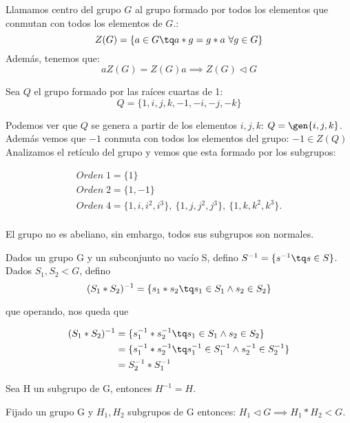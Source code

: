 \documentclass[nochap]{apuntes}
\begin{document}
\begin{defn}
	Llamamos centro del grupo $G$ al grupo formado por todos los elementos que conmutan con todos los elementos de $G$.:\\
	\[ Z(G) = \{ a\in G\tq a\ast g = g\ast a\ \forall g\in G\} \]
	Además, tenemos que:
	\[ aZ(G)=Z(G)a \implies Z(G)\lhd G \]
  \end{defn}  
  
  \begin{example}
	Sea $Q$ el grupo formado por las raíces cuartas de 1:
	\[ Q = \{ 1, i, j, k, -1, -i, -j, -k\} \] 
	
	Podemos ver que $Q$ se genera a partir de los elementos $i, j, k$: $Q = \gen{i,j,k}$.
	Además vemos que $-1$ conmuta con todos los elementos del grupo: $-1 \in Z(Q)$
	Analizamos el retículo del grupo y vemos que esta formado por los subgrupos:
	
	\begin{gather*}
	Orden\; 1 = \{ 1\}\\
	Orden\; 2 = \{ 1, -1\} \\
	Orden\; 4 = \{ 1, i, i^2, i^3\},\
			  \{ 1, j, j^2, j^3 \},\
			  \{ 1, k, k^2, k^3 \}.\\
			  \end{gather*}
			  
		  
	El grupo no es abeliano, sin embargo, todos sus subgrupos son normales.
	
  \end{example}
  
 
 Dados un grupo G y un subconjunto no vacío S, defino $S^{-1}=\{s^{-1}\tq s\in S\}$. Dados $S_{1},S_{2}<G$, defino  \[ (S_{1}\ast S_{2})^{-1}=\{s_{1}\ast s_{2}\tq s_{1}\in S_{1} \wedge s_{2}\in S_{2}\} \]
 
 que operando, nos queda que 
 
 \begin{align*}
 (S_1 \ast S_2)^{-1} &= \{s_{1}^{-1}\ast s_{2}^{-1}\tq s_{1}\in S_{1} \wedge s_{2}\in S_{2}\}\\
 &= \{s_{1}^{-1}\ast s_{2}^{-1}\tq s_{1}^{-1}\in S_{1}^{-1} \wedge s_{2}^{-1}\in S_{2}^{-1}\} \\
 & =S_{2}^{-1}\ast S_{1}^{-1}
 \end{align*}
 
 Sea H un subgrupo de G, entonces $H^{-1}=H$.
 
 \begin{theorem}
  Fijado un grupo G y $H_{1}, H_{2}$  subgrupos de G entonces: $H_{1} \lhd G \implies H_{1}\ast H_{2}<G$. 
 \end{theorem}
 
\end{document}
